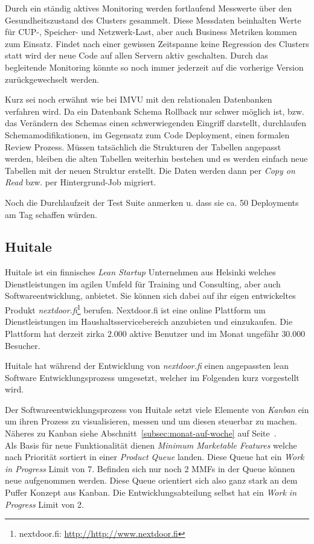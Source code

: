 Durch ein ständig aktives Monitoring werden fortlaufend Messwerte über den
Gesundheitszustand des Clusters gesammelt. Diese Messdaten beinhalten Werte
für CUP-, Speicher- und Netzwerk-Last, aber auch Business Metriken kommen zum
Einsatz. Findet nach einer gewissen Zeitspanne keine Regression des Clusters
statt wird der neue Code auf allen Servern aktiv geschalten. Durch das
begleitende Monitoring könnte so noch immer jederzeit auf die vorherige
Version zurückgewechselt werden.

Kurz sei noch erwähnt wie bei IMVU mit den relationalen Datenbanken verfahren
wird. Da ein Datenbank Schema Rollback nur schwer möglich ist, bzw. das
Verändern des Schemas einen schwerwiegenden Eingriff darstellt, durchlaufen
Schemamodifikationen, im Gegensatz zum Code Deployment, einen formalen Review
Prozess. Müssen tatsächlich die Strukturen der Tabellen angepasst werden,
bleiben die  alten Tabellen weiterhin bestehen und es werden einfach neue
Tabellen mit der neuen Struktur erstellt. Die Daten werden dann per \emph{Copy
on Read} bzw. per Hintergrund-Job migriert.

\begin{wichtigbox}
Noch die Durchlaufzeit der Test Suite anmerken u. dass sie ca. 50 Deployments
am Tag schaffen würden.
\end{wichtigbox}


\subsection{Huitale}

Huitale ist ein finnisches \emph{Lean Startup} Unternehmen aus Helsinki
welches Dienstleistungen im agilen Umfeld für Training und Consulting, aber
auch Softwareentwicklung, anbietet. Sie können sich dabei auf ihr eigen
entwickeltes Produkt \emph{nextdoor.fi}\footnote{nextdoor.fi:
\url{http://http://www.nextdoor.fi}} berufen. Nextdoor.fi ist eine online
Plattform um Dienstleistungen im Haushaltsservicebereich anzubieten und
einzukaufen. Die Plattform hat derzeit zirka $2.000$ aktive Benutzer und im
Monat ungefähr $30.000$ Besucher.

Huitale hat während der Entwicklung von \emph{nextdoor.fi} einen angepassten
lean Software Entwicklungsprozess umgesetzt, welcher im Folgenden kurz
vorgestellt wird.

 Der Softwareentwicklungsprozess von Huitale setzt viele
Elemente von \emph{Kanban} ein um ihren Prozess zu visualisieren, messen und
um diesen steuerbar zu machen. Näheres zu Kanban siehe Abschnitt~\ref{subsec:monat-auf-woche}
auf Seite~\pageref{subsec:monat-auf-woche}. \\
Als Basis für neue Funktionalität dienen \emph{Minimum Marketable Features}
welche nach Priorität sortiert in einer \emph{Product Queue} landen. Diese
Queue hat ein \emph{Work in Progress} Limit von 7. Befinden sich nur noch 2
MMFs in der Queue können neue aufgenommen werden. Diese Queue orientiert sich
also ganz stark an dem Puffer Konzept aus Kanban. Die Entwicklungsabteilung
selbst hat ein \emph{Work in Progress} Limit von 2.

